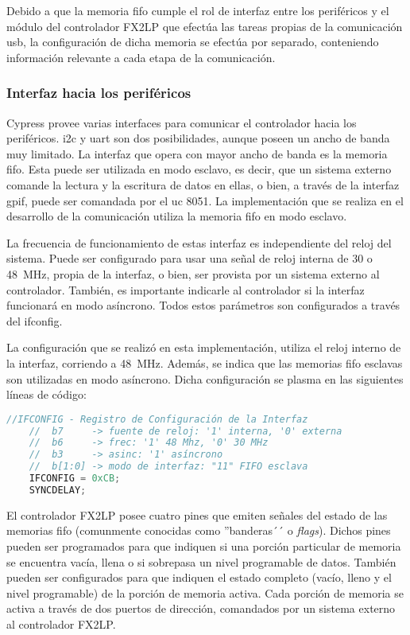 	Debido a que la memoria \acrshort{fifo} cumple el rol de interfaz entre los periféricos y el módulo del controlador FX2LP que efectúa las tareas propias de la comunicación \acrshort{usb}, la configuración de dicha memoria se efectúa por separado, conteniendo información relevante a cada etapa de la comunicación.
	
\subsubsection{Interfaz hacia los periféricos}
	Cypress provee varias interfaces para comunicar el controlador hacia los periféricos. \acrshort{i2c} y \acrshort{uart} son dos posibilidades, aunque poseen un ancho de banda muy limitado. La interfaz que opera con mayor ancho de banda es la memoria \acrshort{fifo}. Esta puede ser utilizada en modo esclavo, es decir, que un sistema externo comande la lectura y la escritura de datos en ellas, o bien, a través de la interfaz \acrshort{gpif}, puede ser comandada por el \acrshort{uc} 8051. La implementación que se realiza en el desarrollo de la comunicación utiliza la memoria \acrshort{fifo} en modo esclavo.
	
	La frecuencia de funcionamiento de estas interfaz es independiente del reloj del sistema. Puede ser configurado para usar una señal de reloj interna de \si{30} o \SI{48}{\mega\hertz}, propia de la interfaz, o bien, ser provista por un sistema externo al controlador. También, es importante indicarle al controlador si la interfaz funcionará en modo asíncrono. Todos estos parámetros son configurados a través del \acrfull{ifconfig}.
	
	La configuración que se realizó en esta implementación, utiliza el reloj interno de la interfaz, corriendo a \SI{48}{\mega\hertz}. Además, se indica que las memorias \acrshort{fifo} esclavas son utilizadas en modo asíncrono. Dicha configuración se plasma en las siguientes líneas de código:
	
	\begin{lstlisting}[language=C,backgroundcolor=\color{gray!30}]
	//IFCONFIG - Registro de Configuración de la Interfaz
	//	b7 	   -> fuente de reloj: '1' interna, '0' externa
	//	b6 	   -> frec: '1' 48 Mhz, '0' 30 MHz
	//	b3 	   -> asinc: '1' asíncrono
	//	b[1:0] -> modo de interfaz: "11" FIFO esclava
	IFCONFIG = 0xCB;
	SYNCDELAY;
	\end{lstlisting}

	El controlador FX2LP posee cuatro pines que emiten señales del estado de las memorias \acrshort{fifo} (comunmente conocidas como ''banderas´´ o \textit{flags}). Dichos pines pueden ser programados para que indiquen si una porción particular de memoria se encuentra vacía, llena o si sobrepasa un nivel programable de datos. También pueden ser configurados para que indiquen el estado completo (vacío, lleno y el nivel programable) de la porción de memoria activa. Cada porción de memoria se activa a través de dos puertos de dirección, comandados por un sistema externo al controlador FX2LP.
	
